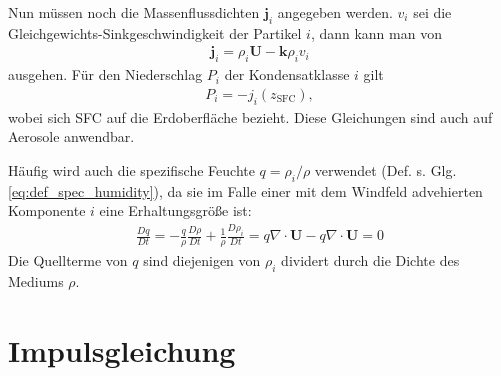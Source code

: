 \documentclass{book}
\newcommand{\md}[1]{\frac{D#1}{Dt}}
\begin{document}
Nun müssen noch die Massenflussdichten $\mathbf{j}_i$ angegeben werden. $v_i$ sei die Gleich\-ge\-wichts-Sink\-ge\-schwin\-dig\-keit der Partikel $i$, dann kann man von
%
\begin{eqnarray}
\mathbf{j}_i = \rho_i\mathbf{U} - \mathbf{k}\rho_iv_i
\end{eqnarray}
%
ausgehen. Für den Niederschlag $P_i$ der Kondensatklasse $i$ gilt
%
\begin{eqnarray}
P_i = -j_i\left(z_{\text{SFC}}\right), 
\end{eqnarray}
%
wobei sich SFC auf die Erdoberfläche bezieht. Diese Gleichungen sind auch auf Aerosole anwendbar.

Häufig wird auch die spezifische Feuchte $q = \rho_i/\rho$ verwendet (Def. s. Glg. \eqref{eq:def_spec_humidity}), da sie im Falle einer mit dem Windfeld advehierten Komponente $i$ eine Erhaltungsgröße ist:
%
\begin{eqnarray}
\md{q} = -\frac{q}{\rho}\md{\rho} + \frac{1}{\rho}\md{\rho_i} = q\nabla\cdot\mathbf{U} - q\nabla\cdot\mathbf{U} = 0
\end{eqnarray}
%
Die Quellterme von $q$ sind diejenigen von $\rho_i$ dividert durch die Dichte des Mediums $\rho$.

\section{Impulsgleichung}
\label{sec:impulsgleichung}
\end{document}

